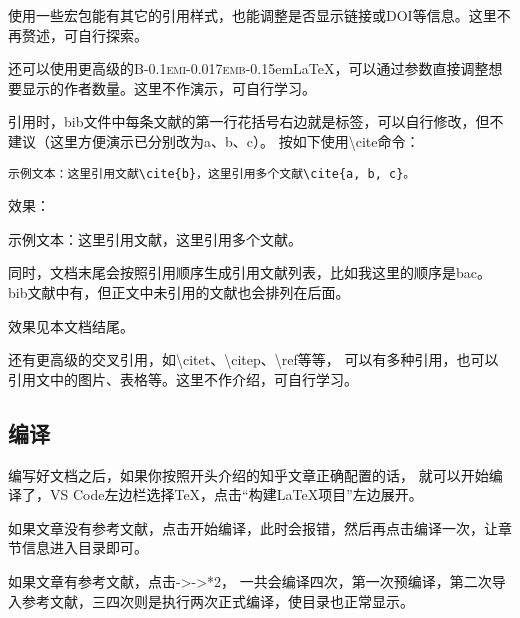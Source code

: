 \newcommand{\BibLaTeX}{\textsc{B\kern-0.1emi\kern-0.017emb}\kern-0.15em\LaTeX}
使用一些宏包能有其它的引用样式，也能调整是否显示链接或DOI等信息。这里不再赘述，可自行探索。

还可以使用更高级的\BibLaTeX{}，可以通过参数直接调整想要显示的作者数量。这里不作演示，可自行学习。

引用时，bib文件中每条文献的第一行花括号右边就是标签，可以自行修改，但不建议（这里方便演示已分别改为a、b、c）。
按如下使用\backslash cite命令：
\begin{center}
\begin{minipage}{0.8\textwidth}
    \hspace{1em}
\begin{lstlisting}[language={[LaTeX]TeX}]
    示例文本：这里引用文献\cite{b}，这里引用多个文献\cite{a, b, c}。
\end{lstlisting}
\end{minipage}
\end{center}
效果：

示例文本：这里引用文献\cite{b}，这里引用多个文献\cite{a, b, c}。

同时，文档末尾会按照引用顺序生成引用文献列表，比如我这里的顺序是bac。
bib文献中有，但正文中未引用的文献也会排列在后面。

效果见本文档结尾。

还有更高级的交叉引用，如\backslash citet、\backslash citep、\backslash ref等等，
可以有多种引用，也可以引用文中的图片、表格等。这里不作介绍，可自行学习。

\subsection{编译}

编写好文档之后，如果你按照开头介绍的知乎文章正确配置的话，
就可以开始编译了，VS Code左边栏选择\TeX{}，点击“构建\LaTeX{}项目”左边展开。

如果文章没有参考文献，点击\XeLaTeX{}开始编译，此时会报错，然后再点击编译一次，让章节信息进入目录即可。

如果文章有参考文献，点击\XeLaTeX{}->\BibTeX{}->\XeLaTeX{}*2，
一共会编译四次，第一次预编译，第二次导入参考文献，三四次则是执行两次正式编译，使目录也正常显示。